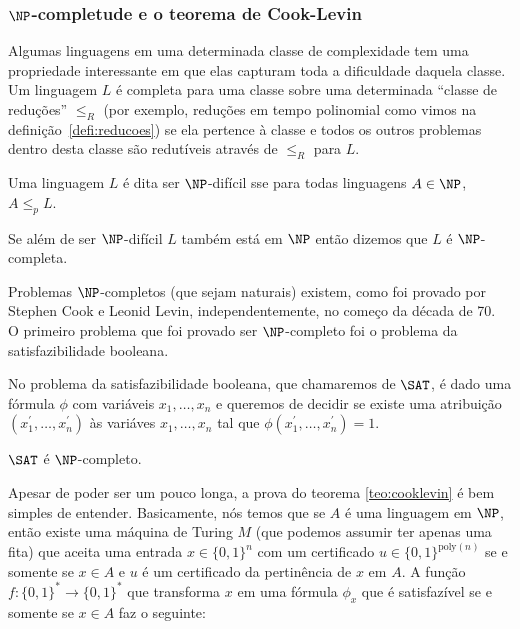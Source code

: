 \subsubsection{$\NP$-completude e o teorema de Cook-Levin}

Algumas linguagens em uma determinada classe de complexidade tem uma propriedade interessante em que elas capturam toda a dificuldade daquela classe. Um linguagem $L$ é completa para uma classe sobre uma determinada ``classe de reduções'' $\leq_{R}$ (por exemplo, reduções em tempo polinomial como vimos na definição~\ref{defi:reducoes}) se ela pertence à classe e todos os outros problemas dentro desta classe são redutíveis através de $\leq_{R}$ para $L$.

\begin{defi} [$\NP$-completude] \label{defi:NPC}

Uma linguagem $L$ é dita ser $\NP$-difícil sse para todas linguagens $A \in \NP$, $A \leq_{p} L$.

Se além de ser $\NP$-difícil $L$ também está em $\NP$ então dizemos que $L$ é $\NP$-completa.

\end{defi}

Problemas $\NP$-completos (que sejam naturais) existem, como foi provado por Stephen Cook e Leonid Levin, independentemente, no começo da década de 70.~\cite{cook1971complexity, levin1973universal} O primeiro problema que foi provado ser $\NP$-completo foi o problema da satisfazibilidade booleana.

\begin{defi}  \label{defi:SAT}

No problema da satisfazibilidade booleana, que chamaremos de $\SAT$, é dado uma fórmula $\phi$ com variáveis $x_{1}, \dots, x_{n}$ e queremos de decidir se existe uma atribuição $(x_{1}^{\prime}, \dots, x_{n}^{\prime})$ às variáves $x_{1}, \dots, x_{n}$ tal que $\phi(x_{1}^{\prime}, \dots, x_{n}^{\prime}) = 1$.

\end{defi}

\begin{teo}  \label{teo:cooklevin}

$\SAT$ é $\NP$-completo.

\end{teo}

Apesar de poder ser um pouco longa, a prova do teorema \ref{teo:cooklevin} é bem simples de entender. Basicamente, nós temos que se $A$ é uma linguagem em $\NP$, então existe uma máquina de Turing $M$ (que podemos assumir ter apenas uma fita) que aceita uma entrada $x \in \{0, 1\}^{n}$ com um certificado $u \in \{0, 1\}^{\text{poly}(n)}$ se e somente se $x \in A$ e $u$ é um certificado da pertinência de $x$ em $A$. A função $f: \{0, 1\}^{*} \to \{0, 1\}^{*}$
que transforma $x$ em uma fórmula $\phi_{x}$ que é satisfazível se e somente se $x \in A$ faz o seguinte:

